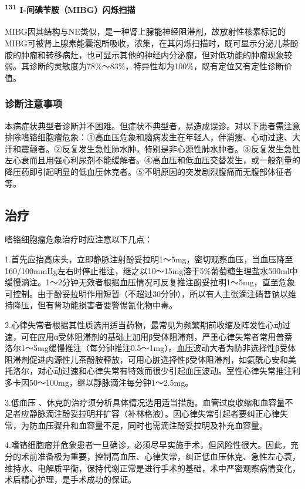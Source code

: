 \paragraph{\textsuperscript{131} I-间碘苄胺（MIBG）闪烁扫描}

MIBG因其结构与NE类似，是一种肾上腺能神经阻滞剂，故放射性核素标记的MIBG可被肾上腺素能囊泡所吸收，浓集，在其闪烁扫描时，既可显示分泌儿茶酚胺的肿瘤和转移病灶，也可显示其他的神经内分泌瘤，但对低功能的肿瘤现象较弱。其诊断的灵敏度为78\%～83\%，特异性却为100\%，既有定位又有定性诊断价值。

\subsubsection{诊断注意事项}

本病症状典型者诊断并不困难。但症状不典型者，易造成误诊。对以下患者需注意排除嗜铬细胞瘤危象：①高血压危象和脑病发生在年轻人，伴消瘦、心动过速、大汗和震颤者。②反复发生急性肺水肿，特别是非心源性肺水肿者。③反复发生急性左心衰而且用强心利尿剂不能缓解者。④高血压和低血压交替发生，或一般剂量的降压药即引起明显的低血压休克者。⑤不明原因的突发剧烈腹痛而无腹部体征者等。

\subsection{治疗}

嗜铬细胞瘤危象治疗时应注意以下几点：

1.首先应抬高床头，立即静脉注射酚妥拉明1～5mg，密切观察血压，当血压降至160/100mmHg左右时停止推注，继之以10～15mg溶于5\%葡萄糖生理盐水500ml中缓慢滴注。1～2分钟无效者根据血压情况可反复推注酚妥拉明1～5mg，直至危象可控制。由于酚妥拉明作用短暂（不超过30分钟），所以有人主张滴注硝普钠以维持降压，但有肾功能损害者要警惕氰化物中毒。

2.心律失常者根据其性质选用适当药物，最常见为频繁期前收缩及阵发性心动过速，可在应用α受体阻滞剂的基础上加用β受体阻滞剂，严重心律失常者常用普萘洛尔1～5mg缓慢推注（每分钟推注0.5～1mg）。血压波动大者为防非选择性β受体阻滞剂促进内源性儿茶酚胺释放，可用心脏选择性β受体阻滞剂，如氨酰心安和美托洛尔，对心动过速和心律失常有特效而很少引起血压波动。室性心律失常推注利多卡因50～100mg，继以静脉滴注每分钟1～2.5mg。

3.低血压
、休克的治疗须分析具体情况选用适当措施。血管过度收缩和血容量不足者应静脉滴注酚妥拉明并扩容（补林格液）。因心律失常引起者要纠正心律失常，为防血压骤升和血容量不足，同时也需滴注酚妥拉明及补充血容量。

4.嗜铬细胞瘤并危象患者一旦确诊，必须尽早实施手术，但风险性很大。因此，充分的术前准备极为重要，控制高血压、心律失常，纠正低血压休克、急性左心衰，维持水、电解质平衡，保持代谢正常是进行手术的基础，术中严密观察病情变化，术后精心护理，是手术成功的保证。
\protect\hypertarget{text00119.html}{}{}

